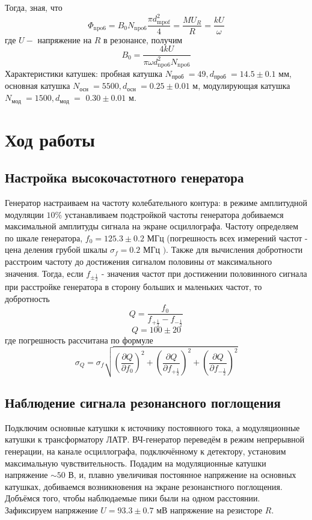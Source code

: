 \documentclass[a4paper, 12pt]{article}%
\begin{document}
Тогда, зная, что
$$
\Phi_{\mathrm{npo} 6}=B_{0} N_{\mathrm{npo} 6} \frac{\pi d_{\mathrm{mpof}}^{2}}{4}=\frac{M U_{R}}{R}=\frac{k U}{\omega}
$$
где $U-$ напряжение на $R$ в резонансе, получим
$$
B_{0}=\frac{4 k U}{\pi \omega d_{\mathrm{npo} 6}^{2} N_{\mathrm{npo} 6}}
$$
Характеристики катушек: пробная катушка $N_{\text {проб }}=49, d_{\text {проб }}=14.5 \pm 0.1$ мм, основная катушка $N_{\text {осн }}=5500, d_{\text {осн }}=0.25 \pm 0.01$ м, модулирующая катушка $N_{\text {мод }}=1500, d_{\text {мод }}=$ $0.30 \pm 0.01$ м.

\section*{Ход работы}
\subsection*{Настройка высокочастотного генератора}
Генератор настраиваем на частоту колебательного контура: в режиме амплитудной модуляции $10 \%$ устанавливаем подстройкой частоты генератора добиваемся максимальной амплитуды сигнала на экране осциллографа. Частоту определяем по шкале генератора, $f_{0}=125.3 \pm 0.2$ МГц (погрешность всех измерений частот - цена деления грубой шкалы $\sigma_{f}=0.2$ МГц $) .$ Также для вычисления добротности расстроим частоту до достижения сигналом половины от максимального значения. Тогда, если $f_{\pm \frac{1}{2}}$ - значения частот при достижении половинного сигнала при расстройке генератора в сторону больших и маленьких частот, то добротность
$$
Q=\frac{f_{0}}{f_{+\frac{1}{2}}-f_{-\frac{1}{2}}}
$$
$$
Q=100 \pm 20
$$
где погрешность рассчитана по формуле
$$
\sigma_{Q}=\sigma_{f} \sqrt{\left(\frac{\partial Q}{\partial f_{0}}\right)^{2}+\left(\frac{\partial Q}{\partial f_{+\frac{1}{2}}}\right)^{2}+\left(\frac{\partial Q}{\partial f_{-\frac{1}{2}}}\right)^{2}}
$$
\subsection*{Наблюдение сигнала резонансного поглощения}
Подключим основные катушки к источнику постоянного тока, а модуляционные катушки к трансформатору ЛАТР. ВЧ-генератор переведём в режим непрерывной генерации, на канале осциллографа, подключённому к детектору, установим максимальную чувствительность. Подадим на модуляционные катушки напряжение $\sim 50$ В, и, плавно увеличивая постоянное напряжение на основных катушках, добиваемся возникновения на экране резонанстного поглощения. Добъёмся того, чтобы наблюдаемые пики были на одном расстоянии. Зафиксируем напряжение $U=93.3 \pm 0.7$ мВ напряжение на резисторе $R$.
\end{document}

